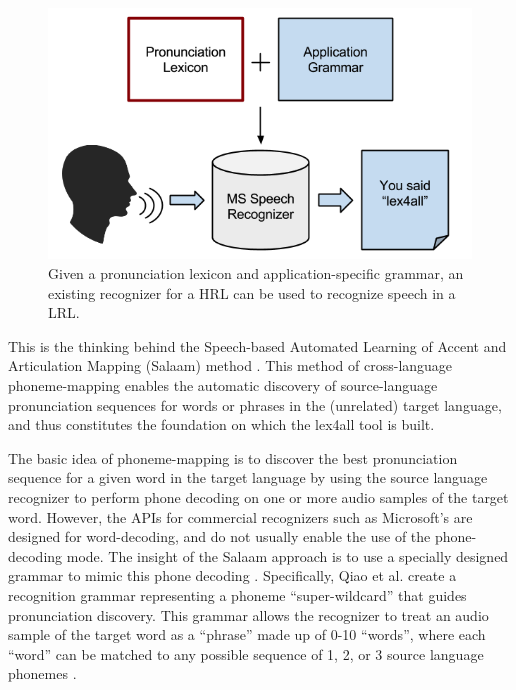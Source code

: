 \documentclass[11pt]{article}
\begin{document}
\begin{figure}[tb]
\begin{center}
\includegraphics[width=\columnwidth]{../img/background-diagram-cropped.png}
\caption{Given a pronunciation lexicon and application-specific grammar, an existing recognizer for a HRL can be used to recognize speech in a LRL.\label{fig:background}}
\end{center}
\end{figure}

This is the thinking behind the Speech-based Automated Learning of Accent and Articulation Mapping (Salaam) method \cite{Sherwani09,Qiao10,Chan12}. This method of cross-language phoneme-mapping enables the automatic discovery of source-language pronunciation sequences for words or phrases in the (unrelated) target language, and thus constitutes the foundation on which the lex4all tool is built.

The basic idea of phoneme-mapping is to discover the best pronunciation sequence for a given word in the target language by using the source language recognizer to perform phone decoding on one or more audio samples of the target word. However, the APIs for commercial recognizers such as Microsoft's are designed for word-decoding, and do not usually enable the use of the phone-decoding mode. The insight of the Salaam approach is to use a specially designed grammar to mimic this phone decoding \cite[\S3.2]{Chan12}. 
Specifically, Qiao et al. \cite[§4.1]{Qiao10} create a recognition grammar representing a phoneme ``super-wildcard'' that guides pronunciation discovery. 
This grammar allows the recognizer to treat an audio sample of the target word as a ``phrase'' made up of 0-10 ``words'',
where each ``word'' can be matched to any possible sequence of 1, 2, or 3 source language phonemes \cite[§4.1]{Qiao10}. 
\end{document}
